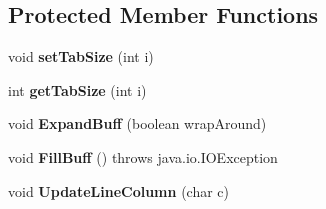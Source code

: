 \subsection*{Protected Member Functions}
\begin{DoxyCompactItemize}
\item 
\mbox{\label{classanalizadores_1_1_simple_char_stream_a541362a1fae4e62732c33646661a1321}} 
void {\bfseries set\+Tab\+Size} (int i)
\item 
\mbox{\label{classanalizadores_1_1_simple_char_stream_a45e004117b5fd71f0849d81c28889899}} 
int {\bfseries get\+Tab\+Size} (int i)
\item 
\mbox{\label{classanalizadores_1_1_simple_char_stream_a58b4fbb1ce2d8d6373aebe1f123c277e}} 
void {\bfseries Expand\+Buff} (boolean wrap\+Around)
\item 
\mbox{\label{classanalizadores_1_1_simple_char_stream_a31af0e9c3b2b4dd07cc37bc16025fcd5}} 
void {\bfseries Fill\+Buff} ()  throws java.\+io.\+I\+O\+Exception   
\item 
\mbox{\label{classanalizadores_1_1_simple_char_stream_a53d68dbbb05497d957c821a210b069ba}} 
void {\bfseries Update\+Line\+Column} (char c)
\end{DoxyCompactItemize}
